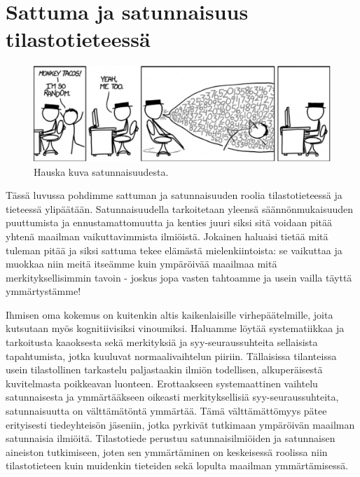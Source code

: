 \documentclass[
]{book}
\begin{document}
\hypertarget{luku4}{%
\chapter{Sattuma ja satunnaisuus tilastotieteessä}\label{luku4}}

\begin{figure}

{\centering \includegraphics[width=1\linewidth]{images/im_so_random} 

}

\caption{Hauska kuva satunnaisuudesta.}\label{fig:random}
\end{figure}

Tässä luvussa pohdimme sattuman ja satunnaisuuden roolia tilastotieteessä ja tieteessä ylipäätään. Satunnaisuudella tarkoitetaan yleensä säännönmukaisuuden puuttumista ja ennustamattomuutta ja kenties juuri siksi sitä voidaan pitää yhtenä maailman vaikuttavimmista ilmiöistä. Jokainen haluaisi tietää mitä tuleman pitää ja siksi sattuma tekee elämästä mielenkiintoista: se vaikuttaa ja muokkaa niin meitä itseämme kuin ympäröivää maailmaa mitä merkityksellisimmin tavoin - joskus jopa vasten tahtoamme ja usein vailla täyttä ymmärtystämme!

Ihmisen oma kokemus on kuitenkin altis kaikenlaisille virhepäätelmille, joita kutsutaan myös kognitiivisiksi vinoumiksi. Haluamme löytää systematiikkaa ja tarkoitusta kaaoksesta sekä merkityksiä ja syy-seuraussuhteita sellaisista tapahtumista, jotka kuuluvat normaalivaihtelun piiriin. Tällaisissa tilanteissa usein tilastollinen tarkastelu paljastaakin ilmiön todellisen, alkuperäisestä kuvitelmasta poikkeavan luonteen. Erottaakseen systemaattinen vaihtelu satunnaisesta ja ymmärtääkseen oikeasti merkityksellisiä syy-seuraussuhteita, satunnaisuutta on välttämätöntä ymmärtää. Tämä välttämättömyys pätee erityisesti tiedeyhteisön jäseniin, jotka pyrkivät tutkimaan ympäröivän maailman satunnaisia ilmiöitä. Tilastotiede perustuu satunnaisilmiöiden ja satunnaisen aineiston tutkimiseen, joten sen ymmärtäminen on keskeisessä roolissa niin tilastotieteen kuin muidenkin tieteiden sekä lopulta maailman ymmärtämisessä.
\end{document}

